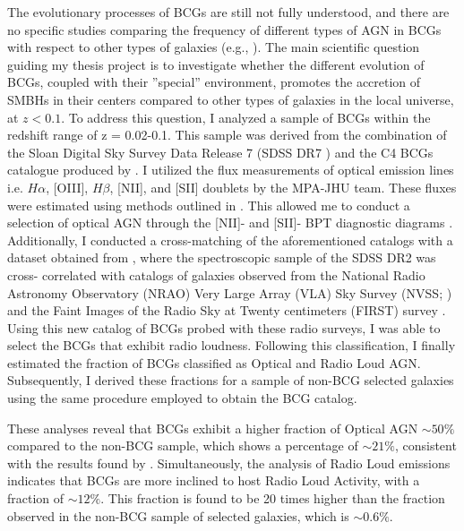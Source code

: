 The evolutionary processes of BCGs are still not fully understood, and there are no specific
studies comparing the frequency of different types of AGN in BCGs with respect to other types of
galaxies (e.g., \cite{2019CoBAO..66..153F}). The main scientific question guiding my thesis project is to
investigate whether the different evolution of BCGs, coupled with their ”special” environment,
promotes the accretion of SMBHs in their centers compared to other types of galaxies in the local
universe, at $z < 0.1$. To address this question, I analyzed a sample of BCGs within the redshift
range of z = 0.02-0.1. This sample was derived from the combination of the Sloan Digital Sky
Survey Data Release 7 (SDSS DR7 \cite{2009ApJS..182..543A}) and the
C4 BCGs catalogue produced by \cite{2007MNRAS.379..867V, 2009yCat..73790867V}. I utilized the flux measurements of optical
emission lines i.e. $H\alpha$, [OIII], $H\beta$, [NII], and [SII] doublets by the MPA-JHU team. These fluxes were
estimated using methods outlined in \cite{1994ApJ...422..158O}. This allowed me to conduct a selection of
optical AGN through the [NII]- and [SII]- BPT diagnostic diagrams  \cite{1981PASP...93....5B}.
Additionally, I conducted a cross-matching of the aforementioned catalogs with a dataset
obtained from \cite{2005MNRAS.362....9B}, where the spectroscopic sample of the SDSS DR2 was cross-
correlated with catalogs of galaxies observed from the National Radio Astronomy Observatory
(NRAO) Very Large Array (VLA) Sky Survey (NVSS; \cite{1998AJ....115.1693C}) and the Faint Images of
the Radio Sky at Twenty centimeters (FIRST) survey \cite{1995ApJ...450..559B}.
Using this new catalog of BCGs probed with these radio surveys, I was able to select the BCGs
that exhibit radio loudness.
Following this classification, I finally estimated the fraction of BCGs
classified as Optical and Radio Loud AGN. Subsequently, I derived these fractions for a sample of
non-BCG selected galaxies using the same procedure employed to obtain the BCG catalog.

These analyses reveal that BCGs exhibit a higher fraction of Optical AGN $\sim50\%$ compared to the
non-BCG sample, which shows a percentage of $\sim21\%$, consistent with the results found by \cite{2012A&A...546A..17V}.
Simultaneously, the analysis of Radio Loud emissions indicates that BCGs are more
inclined to host Radio Loud Activity, with a fraction of  $\sim12\%$.
This fraction is found to be 20 times higher than the fraction observed in 
the non-BCG sample of selected galaxies, which is  $\sim0.6\%$.

